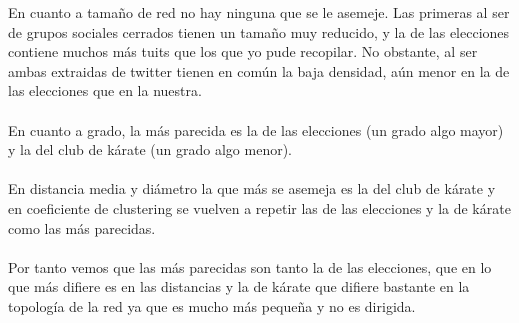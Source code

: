 En cuanto a tamaño de red no hay ninguna que se le asemeje. Las primeras al ser de grupos sociales cerrados tienen un tamaño muy reducido, y la de las elecciones contiene muchos más tuits que los que yo pude recopilar. No obstante, al ser ambas extraidas de twitter tienen en común la baja densidad, aún menor en la de las elecciones que en la nuestra.
\\ \\
En cuanto a grado, la más parecida es la de las elecciones (un grado algo mayor) y la del club de kárate (un grado algo menor).
\\ \\
En distancia media y diámetro la que más se asemeja es la del club de kárate y en coeficiente de clustering se vuelven a repetir las de las elecciones y la de kárate como las más parecidas.
\\ \\
Por tanto vemos que las más parecidas son tanto la de las elecciones, que en lo que más difiere es en las distancias y la de kárate que difiere bastante en la topología de la red ya que es mucho más pequeña y no es dirigida.




